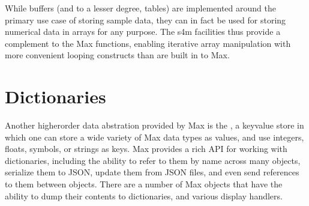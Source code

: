 \documentclass[letterpaper,10pt,english]{sphinxmanual}
\begin{document}
\begin{sphinxVerbatim}[commandchars=\\\{\}]





\end{sphinxVerbatim}

\sphinxAtStartPar
While buffers (and to a lesser degree, tables) are implemented around the primary use case
of storing sample data, they can in fact be used for storing numerical
data in arrays for any purpose. The s4m facilities thus provide a complement to the
Max functions, enabling iterative array manipulation with more convenient
looping constructs than are built in to Max.


\section{Dictionaries}
\label{\detokenize{features_usage:dictionaries}}
\sphinxAtStartPar
Another higher\sphinxhyphen{}order data abstration provided by Max is the
, a key\sphinxhyphen{}value store in which one can store a wide variety
of Max data types as values, and use integers, floats, symbols, or strings
as keys. Max provides a rich API for working with dictionaries, including
the ability to refer to them by name across many objects, serialize them
to JSON, update them from JSON files, and even send references to them
between objects. There are a number of Max objects that have the ability
to dump their contents to dictionaries, and various display handlers.
\end{document}
